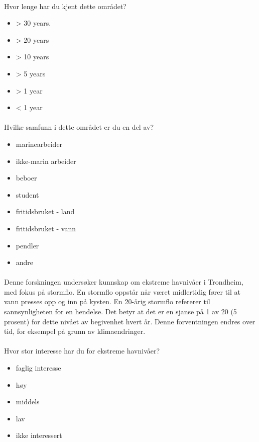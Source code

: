 \paragraph{}

Hvor lenge har du kjent dette området?
\begin{itemize}
	\item > 30 years.
    \item > 20 years
    \item > 10 years
    \item > 5 years
    \item > 1 year
    \item < 1 year
\end{itemize}
\paragraph{}

Hvilke samfunn i dette området er du en del av?
\begin{itemize}
    \item marinearbeider
    \item ikke-marin arbeider
    \item beboer
    \item student
    \item fritidsbruket - land
    \item fritidsbruket - vann
    \item pendler
    \item andre
\end{itemize}   

\paragraph{}
Denne forskningen undersøker kunnskap om ekstreme havnivåer i Trondheim, med fokus på stormflo. En stormflo oppstår når været midlertidig fører til at vann presses opp og inn på kysten. 
En 20-årig stormflo refererer til sannsynligheten for en hendelse. Det betyr at det er en sjanse på 1 av 20 (5 prosent) for dette nivået av begivenhet hvert år. Denne forventningen endres over tid, for eksempel på grunn av klimaendringer.
\paragraph{}

Hvor stor interesse har du for ekstreme havnivåer?
\begin{itemize}
    \item faglig interesse
    \item høy
    \item middels
    \item lav
    \item ikke interessert
\end{itemize}
